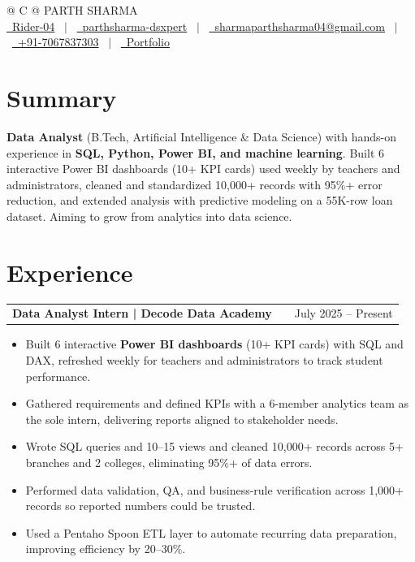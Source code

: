 \documentclass[a4paper,12pt]{article}
\makeatletter
\newenvironment{joblong}[2]
    {
    \begin{tabularx}{\linewidth}{@{}l X r@{}}
    \textbf{#1} & \hfill &  #2 \\[3.75pt]
    \end{tabularx}
    \begin{minipage}[t]{\linewidth}
    \begin{itemize}[nosep,after=\strut, leftmargin=1em, itemsep=3pt,label=--]
    }
    {
    \end{itemize}
    \end{minipage}
    }
\makeatother
\begin{document}
\pagestyle{empty}

\begin{tabularx}{\linewidth}{@{} C @{}}
\Huge{PARTH SHARMA} \\[7.5pt]
\href{https://github.com/Rider-04}{\raisebox{-0.05\height}\faGithub\ Rider-04} \ $|$ \
\href{https://www.linkedin.com/in/parthsharma-dsxpert}{\raisebox{-0.05\height}\faLinkedin\ parthsharma-dsxpert} \ $|$ \
\href{mailto:sharmaparthsharma04@gmail.com}{\raisebox{-0.05\height}\faEnvelope \ sharmaparthsharma04@gmail.com} \ $|$ \
\href{tel:+917067837303}{\raisebox{-0.05\height}\faMobile \ +91-7067837303} \ $|$ \
\href{https://parth-portfolio-virid.vercel.app/}{\raisebox{-0.05\height}\faGlobe \ Portfolio}\end{tabularx}


\section{Summary}
\textbf{Data Analyst} (B.Tech, Artificial Intelligence \& Data Science) with hands-on experience in \textbf{SQL, Python, Power BI, and machine learning}. Built 6 interactive Power BI dashboards (10+ KPI cards) used weekly by teachers and administrators, cleaned and standardized 10,000+ records with 95\%+ error reduction, and extended analysis with predictive modeling on a 55K-row loan dataset. Aiming to grow from analytics into data science.

\section{Experience}

\begin{joblong}{Data Analyst Intern | Decode Data Academy}{July 2025 -- Present}
\item Built 6 interactive \textbf{Power BI dashboards} (10+ KPI cards) with SQL and DAX, refreshed weekly for teachers and administrators to track student performance.
\item Gathered requirements and defined KPIs with a 6-member analytics team as the sole intern, delivering reports aligned to stakeholder needs.
\item Wrote SQL queries and 10--15 views and cleaned 10,000+ records across 5+ branches and 2 colleges, eliminating 95\%+ of data errors.
\item Performed data validation, QA, and business-rule verification across 1,000+ records so reported numbers could be trusted.
\item Used a Pentaho Spoon ETL layer to automate recurring data preparation, improving efficiency by 20--30\%.
\vspace{10pt}
\end{joblong}
\end{document}
